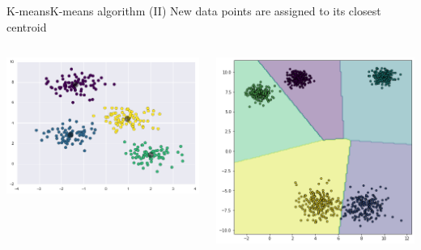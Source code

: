 \documentclass[10pt,compress]{beamer} %
\begin{document}
\begin{frame}{K-means}{K-means algorithm (II)}
    New data points are assigned to its closest centroid
    \begin{columns}
		\includegraphics[width=\textwidth]{figs/kmeans-2.png}

		\includegraphics[width=\textwidth]{figs/voronoi.png}
    \end{columns}
\end{frame}
\end{document}
